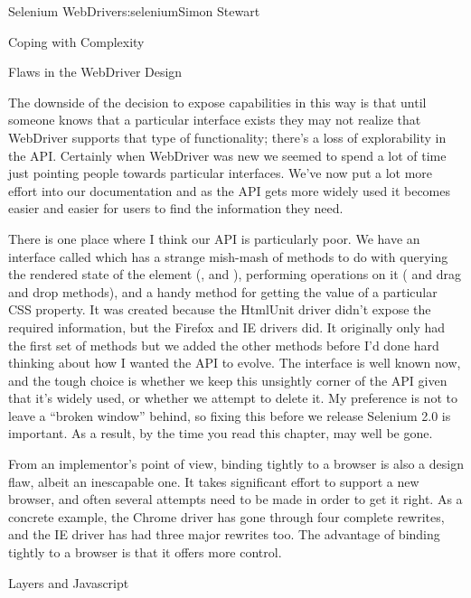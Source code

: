 \begin{aosachapter}{Selenium WebDriver}{s:selenium}{Simon Stewart}
\begin{aosasect1}{Coping with Complexity}
\begin{aosasect2}{Flaws in the WebDriver Design}

The downside of the decision to expose capabilities in this way is
that until someone knows that a particular interface exists they may
not realize that WebDriver supports that type of functionality;
there's a loss of explorability in the API\@. Certainly when WebDriver
was new we seemed to spend a lot of time just pointing people towards
particular interfaces. We've now put a lot more effort into our
documentation and as the API gets more widely used it becomes easier
and easier for users to find the information they need.

There is one place where I think our API is particularly poor. We have
an interface called  which has a strange
mish-mash of methods to do with querying the rendered state of the
element (,  and ),
performing operations on it ( and drag and drop methods),
and a handy method for getting the value of a particular CSS
property. It was created because the HtmlUnit driver didn't expose the
required information, but the Firefox and IE drivers did. It
originally only had the first set of methods but we added the other
methods before I'd done hard thinking about how I wanted the API to
evolve. The interface is well known now, and the tough choice is
whether we keep this unsightly corner of the API given that it's
widely used, or whether we attempt to delete it. My preference is not
to leave a ``broken window'' behind, so fixing this before we release
Selenium 2.0 is important.
As a result, by the time you read this chapter,
 may well be gone.

From an implementor's point of view, binding tightly to a browser is
also a design flaw, albeit an inescapable one. It takes significant
effort to support a new browser, and often several attempts need to be
made in order to get it right. As a concrete example, the Chrome
driver has gone through four complete rewrites, and the IE driver has
had three major rewrites too. The advantage of binding tightly to a
browser is that it offers more control.

\end{aosasect2}

\end{aosasect1}

\begin{aosasect1}{Layers and Javascript}
\label{sec.selenium.layers}


\end{aosasect1}
\end{aosachapter}
